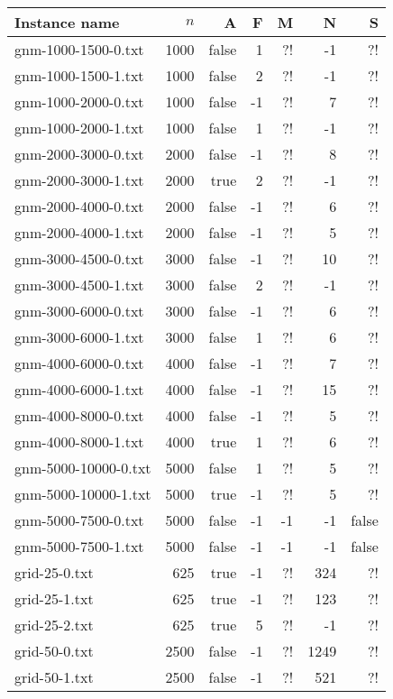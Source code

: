 \documentclass{tufte-handout}
\begin{document}
\begin{tabular}{lrrrrrr}
  \toprule
  Instance name & $n$ & A & F & M & N & S \\
  \midrule
  gnm-1000-1500-0.txt&	1000 &	false &	1 &	?! &	-1 &	?! &	\\
  gnm-1000-1500-1.txt&	1000 &	false &	2 &	?! &	-1 &	?! &	\\
  gnm-1000-2000-0.txt&	1000 &	false &	-1 &	?! &	7 &	?! &	\\
  gnm-1000-2000-1.txt&	1000 &	false &	1 &	?! &	-1 &	?! &	\\
  gnm-2000-3000-0.txt&	2000 &	false &	-1 &	?! &	8 &	?! &	\\
  gnm-2000-3000-1.txt&	2000 &	true &	2 &	?! &	-1 &	?! &	\\
  gnm-2000-4000-0.txt&	2000 &	false &	-1 &	?! &	6 &	?! &	\\
  gnm-2000-4000-1.txt&	2000 &	false &	-1 &	?! &	5 &	?! &	\\
  gnm-3000-4500-0.txt&	3000 &	false &	-1 &	?! &	10 &	?! &	\\
  gnm-3000-4500-1.txt&	3000 &	false &	2 &	?! &	-1 &	?! &	\\
  gnm-3000-6000-0.txt&	3000 &	false &	-1 &	?! &	6 &	?! &	\\
  gnm-3000-6000-1.txt&	3000 &	false &	1 &	?! &	6 &	?! &	\\
  gnm-4000-6000-0.txt&	4000 &	false &	-1 &	?! &	7 &	?! &	\\
  gnm-4000-6000-1.txt&	4000 &	false &	-1 &	?! &	15 &	?! &	\\
  gnm-4000-8000-0.txt&	4000 &	false &	-1 &	?! &	5 &	?! &	\\
  gnm-4000-8000-1.txt&	4000 &	true &	1 &	?! &	6 &	?! &	\\
  gnm-5000-10000-0.txt&	5000 &	false &	1 &	?! &	5 &	?! &	\\
  gnm-5000-10000-1.txt&	5000 &	true &	-1 &	?! &	5 &	?! &	\\
  gnm-5000-7500-0.txt&	5000 &	false &	-1 &	-1 &	-1 &	false &	\\
  gnm-5000-7500-1.txt&	5000 &	false &	-1 &	-1 &	-1 &	false &	\\
  grid-25-0.txt&	625 &	true &	-1 &	?! &	324 &	?! &	\\
  grid-25-1.txt&	625 &	true &	-1 &	?! &	123 &	?! &	\\
  grid-25-2.txt&	625 &	true &	5 &	?! &	-1 &	?! &	\\
  grid-50-0.txt&	2500 &	false &	-1 &	?! &	1249 &	?! &	\\
  grid-50-1.txt&	2500 &	false &	-1 &	?! &	521 &	?! &	\\

\end{tabular}
\end{document}
